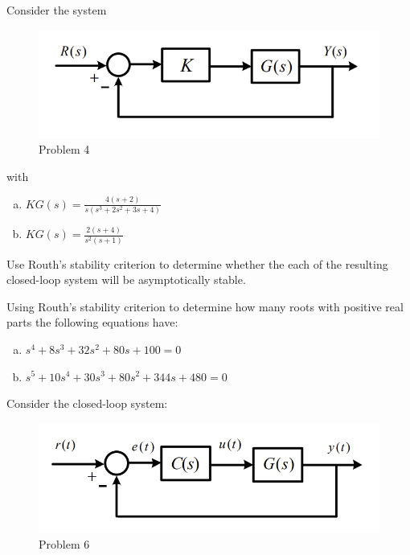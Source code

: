 \documentclass[11pt]{article}
\begin{document}
\soln









Consider the system
\begin{figure}[h] 
    \centering
    \includegraphics[width=0.55 \linewidth]{prob4}
    \caption{Problem 4}
    \label{fig:p4}
\end{figure}

with \begin{enumerate}[a)]
    \item $KG(s) = \frac{4(s+2)}{s(s^3+2s^2+3s+4)}$
    \item $KG(s) = \frac{2(s+4)}{s^2(s+1)}$
\end{enumerate}

Use Routh's stability criterion to determine whether the each of the resulting closed-loop
system will be asymptotically stable.

\soln







Using Routh's stability criterion to determine how many roots with positive
real parts the following equations have: 

\begin{enumerate}[a)]
    \item $s^4 + 8s^3 + 32s^2 + 80s + 100 = 0$
    \item $s^5 + 10s^4 + 30s^3 + 80s^2 + 344s + 480 = 0$
\end{enumerate}

\soln






Consider the closed-loop system:
\begin{figure}[h] 
    \centering
    \includegraphics[width=0.55 \linewidth]{prob6}
    \caption{Problem 6}
    \label{fig:p6}
\end{figure}
\end{document}

